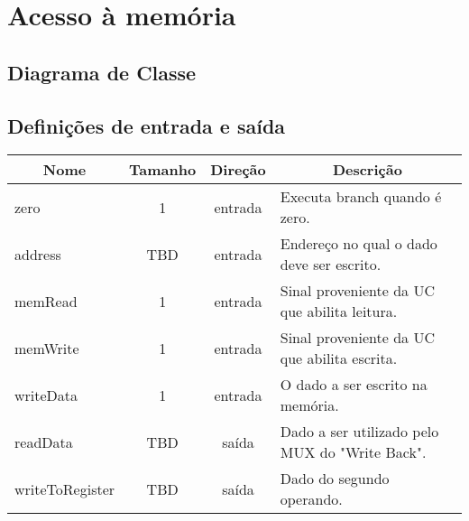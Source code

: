 \section{Acesso à memória}

	\subsection{Diagrama de Classe}


\subsection{Definições de entrada e saída}

	\begin{center}
        \begin{longtable}[pos]{| l | c | c | m{7cm} |} \hline
          \multicolumn{1}{|c|}{\cellcolor[gray]{0.9}\textbf{Nome}} & 
          \multicolumn{1}{c|}{\cellcolor[gray]{0.9}\textbf{Tamanho}} & 
          \multicolumn{1}{c|}{\cellcolor[gray]{0.9}\textbf{Direção}} &
          \multicolumn{1}{c|}{\cellcolor[gray]{0.9}\textbf{Descrição}} \\ \hline
          \endhead
          \hline
          \endlastfoot

          zero          	       & 1   & entrada   & Executa branch quando é zero.    \\ \hline
          address                  & TBD & entrada   & Endereço no qual o dado deve ser escrito.    \\ \hline
          memRead                  & 1   & entrada   & Sinal proveniente da UC que abilita leitura.    \\ \hline
          memWrite                 & 1   & entrada   & Sinal proveniente da UC que abilita escrita.    \\ \hline
          writeData      		   & 1   & entrada   & O dado a ser escrito na memória. \\ \hline
          readData	               & TBD & saída     & Dado a ser utilizado pelo MUX do "Write Back".    \\ \hline
          writeToRegister          & TBD & saída     & Dado do segundo operando.    \\
        \end{longtable}
      \end{center}